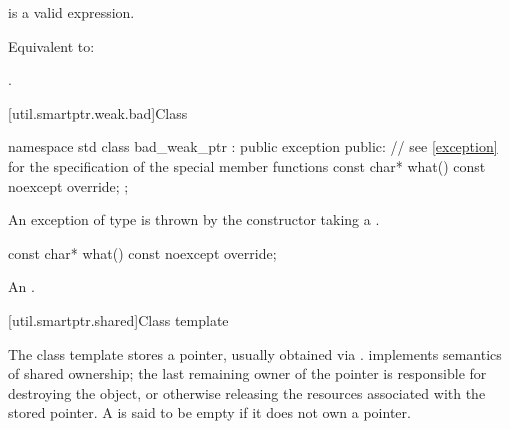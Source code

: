 \begin{itemdescr}
\pnum
\constraints
{} is a valid expression.

\pnum
\effects
Equivalent to: 

\pnum
\returns
{}.
\end{itemdescr}

%
[util.smartptr.weak.bad]{Class }
%
\begin{codeblock}
namespace std {
  class bad_weak_ptr : public exception {
  public:
    // see \ref{exception} for the specification of the special member functions
    const char* what() const noexcept override;
  };
}
\end{codeblock}

\pnum
An exception of type  is thrown by the 
constructor taking a .

%
\begin{itemdecl}
const char* what() const noexcept override;
\end{itemdecl}

\begin{itemdescr}
\pnum
\returns
An  \ntbs{}.
\end{itemdescr}

[util.smartptr.shared]{Class template }

\pnum
{}%
The  class template stores a pointer, usually obtained
via .  implements semantics of shared ownership;
the last remaining owner of the pointer is responsible for destroying
the object, or otherwise releasing the resources associated with the stored pointer. A
 is said to be empty if it does not own a pointer.


